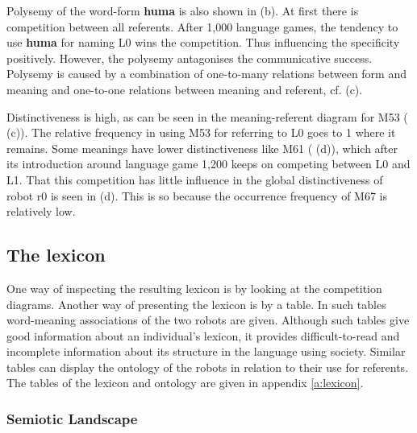 Polysemy of the word-form {\bf huma} is also shown in  (b). At first there is competition between all referents. After 1,000 language games, the tendency to use {\bf huma} for naming L0 wins the competition. Thus influencing the specificity positively. However, the polysemy antagonises the communicative success. Polysemy is caused by a combination of one-to-many relations between form and meaning and one-to-one relations between meaning and referent, cf.  (c).

Distinctiveness is high, as can be seen in the meaning-referent diagram for M53 ( (c)). The relative frequency in using M53 for referring to L0 goes to 1 where it remains. Some meanings have lower distinctiveness like M61 ( (d)), which after its introduction around language game 1,200 keeps on competing between L0 and L1. That this competition has little influence in the global distinctiveness of robot r0 is seen in  (d). This is so because the occurrence frequency of M67 is relatively low.

\subsection{The lexicon}

One way of inspecting the resulting lexicon is by looking at the competition diagrams. Another way of presenting the lexicon is by a table. In such tables word-meaning associations of the two robots are given. Although such tables give good information about an individual's lexicon, it provides difficult-to-read and incomplete information about its structure in the language using society. Similar tables can display the ontology of the robots in relation to their use for referents. The tables of the lexicon and ontology are given in appendix \ref{a:lexicon}.

\subsubsection{Semiotic Landscape}

